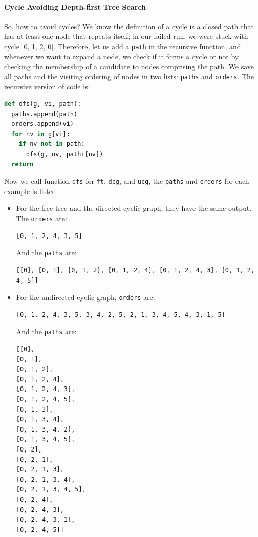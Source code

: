 \documentclass[../main.tex]{subfiles}
\begin{document}
\paragraph{Cycle Avoiding Depth-first Tree Search} 
So, how to avoid cycles? We know the definition of a cycle is a closed path that has  at least one node that repeats itself; in our failed run, we were stuck with cycle [0, 1, 2, 0]. Therefore, let us add a \texttt{path} in the recursive function, and whenever we want to expand a node, we check if it forms a cycle or not by checking the membership of a candidate to nodes comprising the path.  
We save all paths and the visiting ordering of nodes in two lists: \texttt{paths} and \texttt{orders}. The recursive version of code is:
\begin{lstlisting}[language=Python]
def dfs(g, vi, path):
  paths.append(path)
  orders.append(vi)
  for nv in g[vi]:  
    if nv not in path: 
      dfs(g, nv, path+[nv])
  return 
\end{lstlisting}
Now we call function \texttt{dfs} for \texttt{ft}, \texttt{dcg}, and \texttt{ucg}, the \texttt{paths} and \texttt{orders} for each example is listed:
\begin{itemize}
    \item For the free tree and the directed cyclic graph, they have the same output. The \texttt{orders} are:
\begin{lstlisting}[numbers=none]
[0, 1, 2, 4, 3, 5]
\end{lstlisting}
    And the \texttt{paths} are:
\begin{lstlisting}[numbers=none]
[[0], [0, 1], [0, 1, 2], [0, 1, 2, 4], [0, 1, 2, 4, 3], [0, 1, 2, 4, 5]]
\end{lstlisting}
    \item For the undirected cyclic graph, \texttt{orders} are:
\begin{lstlisting}[numbers=none]
[0, 1, 2, 4, 3, 5, 3, 4, 2, 5, 2, 1, 3, 4, 5, 4, 3, 1, 5]
\end{lstlisting}
    And the \texttt{paths} are:
\begin{lstlisting}[numbers=none]
[[0],
[0, 1],
[0, 1, 2],
[0, 1, 2, 4],
[0, 1, 2, 4, 3],
[0, 1, 2, 4, 5],
[0, 1, 3],
[0, 1, 3, 4],
[0, 1, 3, 4, 2],
[0, 1, 3, 4, 5],
[0, 2],
[0, 2, 1],
[0, 2, 1, 3],
[0, 2, 1, 3, 4],
[0, 2, 1, 3, 4, 5],
[0, 2, 4],
[0, 2, 4, 3],
[0, 2, 4, 3, 1],
[0, 2, 4, 5]]
\end{lstlisting}
\end{itemize}
\end{document}
